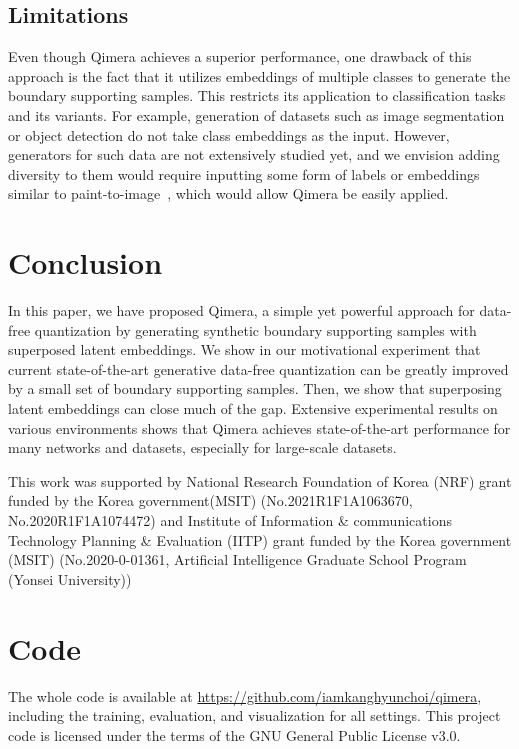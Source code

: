 \documentclass{article}
\newcommand{\aname}{Qimera\xspace}
\newcommand{\KH}[1]{{\color{purple}[\textbf{\sc KH}: \textit{#1}]}}
\renewcommand{\KH}[1]{}
\begin{document}
\subsection{Limitations} \KH{CHECK!}
Even though \aname achieves a superior performance, one drawback of this approach is the fact that it utilizes embeddings of multiple classes to generate the boundary supporting samples. 
This restricts its application to classification tasks and its variants. 
For example, generation of datasets such as image segmentation or object detection do not take class embeddings as the input.
However, generators for such data are not extensively studied yet, and we envision adding diversity to them would require inputting some form of labels or embeddings similar to paint-to-image~\cite{singan}, which would allow \aname be easily applied.








\section{Conclusion}
In this paper, we have proposed \aname, a simple yet powerful approach for data-free quantization by generating synthetic boundary supporting samples with superposed latent embeddings.
We show in our motivational experiment that current state-of-the-art generative data-free quantization can be greatly improved by a small set of boundary supporting samples.
Then, we show that superposing latent embeddings can close much of the gap.
Extensive experimental results on various environments shows that \aname achieves state-of-the-art performance for many networks and datasets, especially for large-scale datasets.

\acksection
This work was supported by 
National Research Foundation of Korea (NRF) grant funded by the Korea government(MSIT) (No.2021R1F1A1063670, No.2020R1F1A1074472) and 
Institute of Information \& communications Technology Planning \& Evaluation (IITP) grant funded by the Korea government (MSIT) (No.2020-0-01361, Artificial Intelligence Graduate School Program (Yonsei University))  






\printbibliography
\appendix
\setcounter{figure}{4}
\setcounter{table}{5}
\setcounter{equation}{12}

\renewcommand{\thesection}{\Alph{section}}
\newpage


\section{Code}
The whole code is available at \url{https://github.com/iamkanghyunchoi/qimera}, including the training, evaluation, and visualization for all settings. This project code is licensed under the terms of the GNU General Public License v3.0. 
\end{document}
